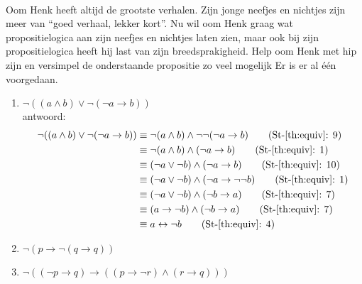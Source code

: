 \begin{exercise}\mbox{}\\
Oom Henk heeft altijd de grootste verhalen. Zijn jonge neefjes en nichtjes zijn meer van \enquote{goed verhaal, lekker kort}. Nu wil oom Henk graag wat propositielogica aan zijn neefjes en nichtjes laten zien, maar ook bij zijn propositielogica heeft hij last van zijn breedsprakigheid. Help oom Henk met hip zijn en versimpel de onderstaande propositie zo veel mogelijk  Er is er al één voorgedaan. 
\begin{enumerate}[label=\textit{\alph*.}]
\item $\neg ((a\land b) \lor \neg(\neg a \rightarrow b))$\\
antwoord:
\begin{align}
\neg ((a\wedge b)\vee \neg (\neg a\rightarrow b)) &\equiv \neg (a\wedge b) \wedge \neg \neg (\neg a\rightarrow b)  \tag{St-\ref{th:equiv}: 9} \\
&\equiv \neg (a\wedge b) \wedge (\neg a\rightarrow b)   \tag{St-\ref{th:equiv}: 1} \\
&\equiv (\neg a \vee \neg b) \wedge (\neg a\rightarrow b) \tag{St-\ref{th:equiv}: 10} \\
&\equiv (\neg a \vee \neg b) \wedge (\neg a\rightarrow \neg \neg b) \tag{St-\ref{th:equiv}: 1} \\
&\equiv (\neg a \vee \neg b) \wedge (\neg b \rightarrow a) \tag{St-\ref{th:equiv}: 7} \\
&\equiv (a \rightarrow \neg b) \wedge (\neg b \rightarrow a) \tag{St-\ref{th:equiv}: 7} \\
&\equiv a \leftrightarrow \neg b \tag{St-\ref{th:equiv}: 4}
\end{align}
\item $\neg (p \rightarrow \neg (q \rightarrow q))$
\item $\neg((\neg p\rightarrow q)\rightarrow ((p\rightarrow\neg r)\wedge(r\rightarrow q)))$
\end{enumerate}
\end{exercise}

